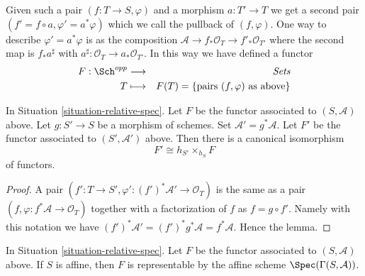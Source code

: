 \medskip\noindent
Given such a
pair $(f : T \to S, \varphi)$ and a morphism $a : T' \to T$ we get
a second pair $(f' = f \circ a, \varphi' = a^*\varphi)$ which we
call the pullback of $(f, \varphi)$. One way to describe
$\varphi' = a^*\varphi$ is as the composition
$\mathcal{A} \to f_*\mathcal{O}_T \to f'_*\mathcal{O}_{T'}$
where the second map is $f_*a^\sharp$ with
$a^\sharp : \mathcal{O}_T \to a_*\mathcal{O}_{T'}$.
In this way we have defined a functor
\begin{eqnarray}
\label{equation-spec}
F : \Sch^{opp} & \longrightarrow & \textit{Sets} \\
T & \longmapsto & F(T) = \{\text{pairs }(f, \varphi) \text{ as above}\}
\nonumber
\end{eqnarray}

\begin{lemma}
\label{lemma-spec-base-change}
In Situation \ref{situation-relative-spec}.
Let $F$ be the functor
associated to $(S, \mathcal{A})$ above.
Let $g : S' \to S$ be a morphism of schemes.
Set $\mathcal{A}' = g^*\mathcal{A}$. Let $F'$ be the
functor associated to $(S', \mathcal{A}')$ above.
Then there is a canonical isomorphism
$$
F' \cong h_{S'} \times_{h_S} F
$$
of functors.
\end{lemma}

\begin{proof}
A pair $(f' : T \to S', \varphi' : (f')^*\mathcal{A}' \to \mathcal{O}_T)$
is the same as a pair $(f, \varphi : f^*\mathcal{A} \to \mathcal{O}_T)$
together with a factorization of $f$ as $f = g \circ f'$. Namely with
this notation we have
$(f')^* \mathcal{A}' = (f')^*g^*\mathcal{A} = f^*\mathcal{A}$.
Hence the lemma.
\end{proof}

\begin{lemma}
\label{lemma-spec-affine}
In Situation \ref{situation-relative-spec}.
Let $F$ be the functor associated to $(S, \mathcal{A})$ above.
If $S$ is affine, then $F$ is representable by the
affine scheme $\Spec(\Gamma(S, \mathcal{A}))$.
\end{lemma}

